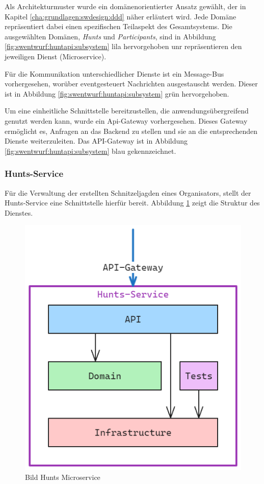 Als Architekturmuster wurde ein domänenorientierter Ansatz gewählt, der in Kapitel \ref{cha:grundlagen:swdesign:ddd} näher erläutert wird. Jede Domäne repräsentiert dabei einen spezifischen Teilaspekt des Gesamtsystems. Die ausgewählten Domänen, \textit{Hunts} und \textit{Participants}, sind in Abbildung \ref{fig:swentwurf:huntapi:subsystem} lila hervorgehoben unr repräsentieren den jeweiligen Dienst (Microservice).

Für die Kommunikation unterschiedlicher Dienste ist ein Message-Bus vorhergesehen, worüber eventgesteuert Nachrichten ausgestauscht werden. Dieser ist in Abbildung \ref{fig:swentwurf:huntapi:subsystem} grün hervorgehoben.

Um eine einheitliche Schnittstelle bereitzustellen, die anwendungsübergreifend genutzt werden kann, wurde ein Api-Gateway vorhergesehen. Dieses Gateway ermöglicht es, Anfragen an das Backend zu stellen und sie an die entsprechenden Dienste weiterzuleiten. Das API-Gateway ist in Abbildung \ref{fig:swentwurf:huntapi:subsystem} blau gekennzeichnet.

\subsubsection{Hunts-Service} \label{cha:swentwurf:huntsservice}

Für die Verwaltung der erstellten Schnitzeljagden eines Organisators, stellt der Hunts-Service eine Schnittstelle hierfür bereit. Abbildung \ref{fig:swentwurf:huntapi:huntservice} zeigt die Struktur des Dienstes.

\begin{figure}[H]
    \centering
    \includegraphics[width=\textwidth]{images/PrAr-Software-Entwurf-Hunt-Api-Hunt-Service.png}
    \caption{Bild Hunts Microservice}
    \label{fig:swentwurf:huntapi:huntservice}
\end{figure}

